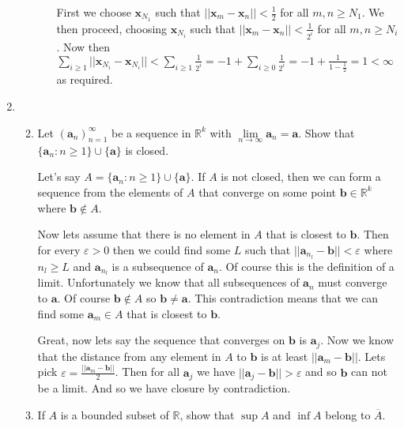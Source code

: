 \documentclass[letterpaper]{article}
\begin{document}
\begin{enumerate}
\begin{enumerate}
\begin{enumerate}
      First we choose $\boldsymbol{x}_{N_1}$ such that $||\boldsymbol{x}_m-\boldsymbol{x}_n||<\frac{1}{2}$ for all $m,n\ge N_1$.
      We then proceed, choosing $\boldsymbol{x}_{N_i}$ such that $||\boldsymbol{x}_m-\boldsymbol{x}_n||<\frac{1}{2^i}$ for all $m,n\ge N_i$.
      Now then $\sum_{i\ge1}||\boldsymbol{x}_{N_i}-\boldsymbol{x}_{N_i}||<\sum_{i\ge1}\frac{1}{2^i}=-1+\sum_{i\ge0}\frac{1}{2^i}=-1+\frac{1}{1-\frac{1}{2}}=1<\infty$ as required.
    \end{enumerate}
  \end{enumerate}
\item
  \begin{enumerate}
  \setcounter{enumii}{1}
  \item
    Let $(\boldsymbol{a}_n)_{n=1}^\infty$ be a sequence in $\mathbb{R}^k$ with $\lim\limits_{n\to\infty}\boldsymbol{a}_n=\boldsymbol{a}$. Show that $\{\boldsymbol{a}_n:n\ge 1\}\cup\{\boldsymbol{a}\}$ is closed.

    Let's say $A=\{\boldsymbol{a}_n:n\ge1\}\cup\{\boldsymbol{a}\}$.
    If $A$ is not closed, then we can form a sequence from the elements of $A$ that converge on some point $\boldsymbol{b}\in\mathbb{R}^k$ where $\boldsymbol{b}\not\in A$.

    Now lets assume that there is no element in $A$ that is closest to $\boldsymbol{b}$.
    Then for every $\varepsilon>0$ then we could find some $L$ such that $||\boldsymbol{a}_{n_l}-\boldsymbol{b}||<\varepsilon$ where $n_l\ge L$ and $\boldsymbol{a}_{n_l}$ is a subsequence of $\boldsymbol{a}_n$.
    Of course this is the definition of a limit.
    Unfortunately we know that all subsequences of $\boldsymbol{a}_n$ must converge to $\boldsymbol{a}$.
    Of course $\boldsymbol{b}\not\in A$ so $\boldsymbol{b}\ne \boldsymbol{a}$.
    This contradiction means that we can find some $\boldsymbol{a}_m\in A$ that is closest to $\boldsymbol{b}$.

    Great, now lets say the sequence that converges on $\boldsymbol{b}$ is $\boldsymbol{a}_j$.
    Now we know that the distance from any element in $A$ to $\boldsymbol{b}$ is at least $||\boldsymbol{a}_m-\boldsymbol{b}||$.
    Lets pick $\varepsilon=\frac{||\boldsymbol{a}_m-\boldsymbol{b}||}{2}$.
    Then for all $\boldsymbol{a}_j$ we have $||\boldsymbol{a}_j-\boldsymbol{b}||>\varepsilon$ and so $\boldsymbol{b}$ can not be a limit.
    And so we have closure by contradiction.
  \setcounter{enumii}{3}
  \item
    If $A$ is a bounded subset of $\mathbb{R}$, show that $\sup A$ and $\inf A$ belong to $\overline{A}$.


\end{enumerate}
\end{enumerate}
\end{document}

